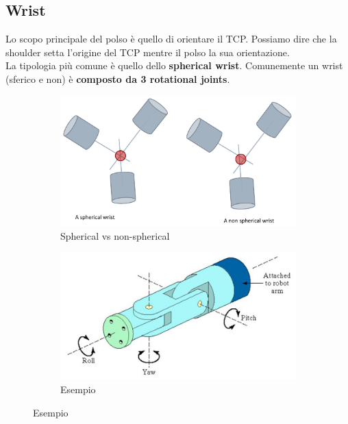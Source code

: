 \subsection{Wrist}
Lo scopo principale del polso è quello di orientare il TCP. Possiamo dire che la shoulder setta l'origine del TCP mentre il polso la sua orientazione.\\
La tipologia più comune è quello dello \textbf{spherical wrist}. Comunemente un wrist (sferico e non) è \textbf{composto da 3 rotational joints}.

\begin{figure}[H]
	\begin{subfigure}{0.6\linewidth}
		\centering
		\includegraphics[width=0.8\linewidth]{images/kinematic_chains_13}
		\caption{Spherical vs non-spherical}
		\label{fig:kinematicchains13}
	\end{subfigure}
	\hfill
	\begin{subfigure}{0.4\linewidth}
		\centering
		\includegraphics[width=0.9\linewidth]{images/kinematic_chains_14}
		\caption{Esempio}
		\label{fig:kinematicchains14}
	\end{subfigure}
\end{figure}





